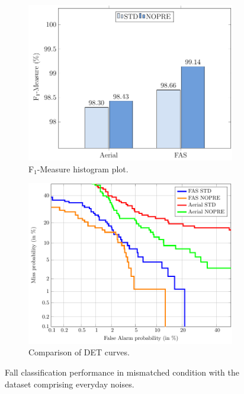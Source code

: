 \begin{figure}[t]
	\centering
	\begin{subfigure}[b]{0.6\textwidth}
		\includegraphics[width=\textwidth]{img/winr2016/pgfsource/8_bck_mismatched/BAR_8_bck_mismatched.pdf}
		\caption{F$_1$-Measure histogram plot.}\label{fig:mism_bck_BAR}	
	\end{subfigure}
	\hspace{5mm}
	\begin{subfigure}[b]{0.6\textwidth}
		\includegraphics[width=\textwidth]{img/winr2016/matlab2tikz/8_bck_mismatched/DET_8_bck_mismatched.pdf}
		\caption{Comparison of DET curves.}\label{fig:mism_bck_DET}	
	\end{subfigure}
	\caption{Fall classification performance in mismatched condition with the dataset comprising everyday noises.}

\end{figure}

